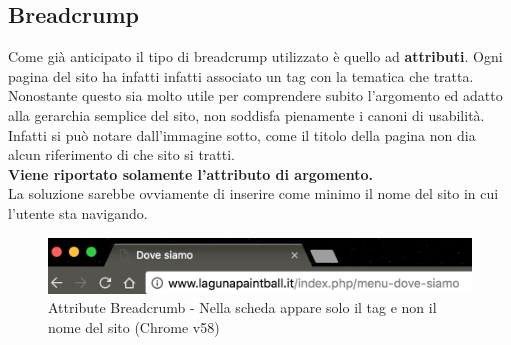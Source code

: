 \documentclass[../Relazione.tex]{subfiles}
\begin{document}
	\subsection{Breadcrump}
		Come già anticipato il tipo di breadcrump utilizzato è quello ad \textbf{attributi}. Ogni pagina del sito ha infatti infatti associato un tag con la tematica che tratta.
		Nonostante questo sia molto utile per comprendere subito l'argomento ed adatto alla gerarchia semplice del sito, non soddisfa pienamente i canoni di usabilità.
		Infatti si può notare dall'immagine sotto, come il titolo della pagina non dia alcun riferimento di che sito si tratti.\\ \textbf{Viene riportato solamente l'attributo di argomento.}\\
		La soluzione sarebbe ovviamente di inserire come minimo il nome del sito in cui l'utente sta navigando.

		\begin{figure}[!h]
			\centering
			\includegraphics[scale=0.7]{img/contenuto/bread.png}
			\caption{Attribute Breadcrumb - Nella scheda appare solo il tag e non il nome del sito (Chrome v58)}
			\label{fig:label}
		\end{figure}
		
\newpage
\end{document}
